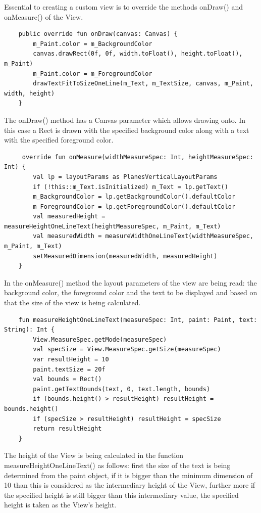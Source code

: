 Essential to creating a custom view is to override the methods onDraw() and onMeasure() of the View.

\begin{lstlisting}
	public override fun onDraw(canvas: Canvas) {
		m_Paint.color = m_BackgroundColor
		canvas.drawRect(0f, 0f, width.toFloat(), height.toFloat(), m_Paint)
		m_Paint.color = m_ForegroundColor
		drawTextFitToSizeOneLine(m_Text, m_TextSize, canvas, m_Paint, width, height)
	}
\end{lstlisting}

The onDraw() method has a Canvas parameter which allows drawing onto. In this case a Rect is drawn with the specified background color along with a text with the specified foreground color. 

\begin{lstlisting}
	 override fun onMeasure(widthMeasureSpec: Int, heightMeasureSpec: Int) {
		val lp = layoutParams as PlanesVerticalLayoutParams
		if (!this::m_Text.isInitialized) m_Text = lp.getText()
		m_BackgroundColor = lp.getBackgroundColor().defaultColor
		m_ForegroundColor = lp.getForegroundColor().defaultColor
		val measuredHeight = measureHeightOneLineText(heightMeasureSpec, m_Paint, m_Text)
		val measuredWidth = measureWidthOneLineText(widthMeasureSpec, m_Paint, m_Text)
		setMeasuredDimension(measuredWidth, measuredHeight)
	}
\end{lstlisting}

In the onMeasure() method the layout parameters of the view are being read: the background color, the foreground color and the text to be displayed and based on that the size of the view is being calculated.

\begin{lstlisting}
	fun measureHeightOneLineText(measureSpec: Int, paint: Paint, text: String): Int {
		View.MeasureSpec.getMode(measureSpec)
		val specSize = View.MeasureSpec.getSize(measureSpec)
		var resultHeight = 10
		paint.textSize = 20f
		val bounds = Rect()
		paint.getTextBounds(text, 0, text.length, bounds)
		if (bounds.height() > resultHeight) resultHeight = bounds.height()
		if (specSize > resultHeight) resultHeight = specSize
		return resultHeight
	}
\end{lstlisting}

The height of the View is being calculated in the function measureHeightOneLineText() as follows: first the size of the text is being determined from the paint object, if it is bigger than the minimum dimension of 10 than this is considered as the intermediary height of the View, further more if the specified height is still bigger than this intermediary value, the specified height is taken as the View's height.

